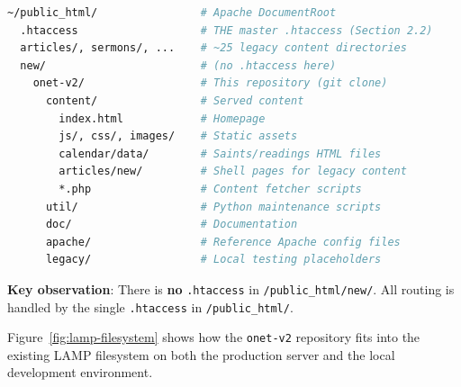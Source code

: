 \documentclass[12pt]{article}
\begin{document}
\begin{lstlisting}[language=bash,numbers=none,basicstyle=\ttfamily\scriptsize]
~/public_html/                # Apache DocumentRoot
  .htaccess                   # THE master .htaccess (Section 2.2)
  articles/, sermons/, ...    # ~25 legacy content directories
  new/                        # (no .htaccess here)
    onet-v2/                  # This repository (git clone)
      content/                # Served content
        index.html            # Homepage
        js/, css/, images/    # Static assets
        calendar/data/        # Saints/readings HTML files
        articles/new/         # Shell pages for legacy content
        *.php                 # Content fetcher scripts
      util/                   # Python maintenance scripts
      doc/                    # Documentation
      apache/                 # Reference Apache config files
      legacy/                 # Local testing placeholders
\end{lstlisting}

\textbf{Key observation}: There is \textbf{no} \texttt{.htaccess} in \texttt{/public\_html/new/}. All routing is handled by the single \texttt{.htaccess} in \texttt{/public\_html/}.

Figure~\ref{fig:lamp-filesystem} shows how the \texttt{onet-v2} repository fits into the existing LAMP filesystem on both the production server and the local development environment.
\end{document}
